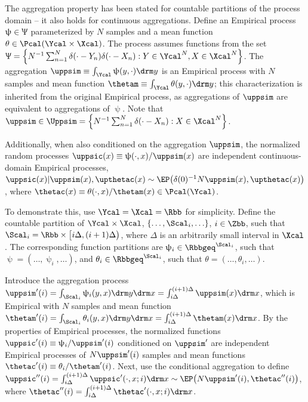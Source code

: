 \documentclass[12pt]{report}
\begin{document}
The aggregation property has been stated for countable partitions of the process domain -- it also holds for continuous aggregations. Define an Empirical process $\uppsi \in \Uppsi$ parameterized by $N$ samples and a mean function $\theta \in \Pcal(\Ycal \times \Xcal)$. The process assumes functions from the set $\Uppsi = \left\{ N^{-1} \sum_{n=1}^N \delta(\cdot - Y_n) \delta(\cdot - X_n) : Y \in \Ycal^N, X \in \Xcal^N \right\}$. The aggregation $\uppsim \equiv \int_{\Ycal} \uppsi(y,\cdot) {\drm}y$ is an Empirical process with $N$ samples and mean function $\thetam \equiv \int_{\Ycal} \theta(y,\cdot) {\drm}y$; this characterization is inherited from the original Empirical process, as aggregations of $\uppsim$ are equivalent to aggregations of $\uppsi$. Note that $\uppsim \in \Uppsim = \left\{ N^{-1} \sum_{n=1}^N \delta(\cdot - X_n) : X \in \Xcal^N \right\}$.

Additionally, when also conditioned on the aggregation $\uppsim$, the normalized random processes $\uppsic(x) \equiv \uppsi(\cdot,x) / \uppsim(x)$ are independent continuous-domain Empirical processes, $\uppsic(x) | \uppsim(x), \upthetac(x) \sim \EP\big(\delta(0)^{-1} N \uppsim(x), \upthetac(x)\big)$, where $\thetac(x) \equiv \theta(\cdot,x) / \thetam(x) \in \Pcal(\Ycal)$.



To demonstrate this, use $\Ycal = \Xcal = \Rbb$ for simplicity. Define the countable partition of $\Ycal \times \Xcal$, $\left\{ \ldots,\Scal_i,\ldots \right\}$, $i \in \Zbb$, such that $\Scal_i = \Rbb \times \big [i\Delta,(i+1)\Delta \big)$, where $\Delta$ is an arbitrarily small interval in $\Xcal$. The corresponding function partitions are $\uppsi_i \in \Rbbgeq^{\Scal_i}$, such that $\uppsi = \left( \ldots,\uppsi_i,\ldots \right)$, and $\theta_i \in \Rbbgeq^{\Scal_i}$, such that $\theta = \left( \ldots,\theta_i,\ldots \right)$.

Introduce the aggregation process $\uppsim'(i) = \int_{\Scal_i} \uppsi_i(y,x) {\drm}y {\drm}x = \int_{i\Delta}^{(i+1)\Delta} \uppsim(x) {\drm}x$, which is Empirical with $N$ samples and mean function $\thetam'(i) = \int_{\Scal_i} \theta_i(y,x) {\drm}y {\drm}x = \int_{i\Delta}^{(i+1)\Delta} \thetam(x) {\drm}x$. By the properties of Empirical processes, the normalized functions $\uppsic'(i) \equiv \uppsi_i / \uppsim'(i)$ conditioned on $\uppsim'$ are independent Empirical processes of $N \uppsim'(i)$ samples and mean functions $\thetac'(i) \equiv \theta_i / \thetam'(i)$. Next, use the conditional aggregation to define $\uppsic''(i) = \int_{i\Delta}^{(i+1)\Delta} \uppsic'(\cdot,x;i) {\drm}x \sim \EP\big( N \uppsim'(i), \thetac''(i) \big)$, where $\thetac''(i) = \int_{i\Delta}^{(i+1)\Delta} \thetac'(\cdot,x;i) {\drm}x$. 
\end{document}
